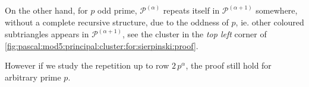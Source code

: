 
On the other hand, for $p$ odd prime, $\mathcal{P}^{(\alpha)}$ repeats itself
in $\mathcal{P}^{(\alpha+1)}$ somewhere, without a complete recursive
structure, due to the oddness of $p$, ie. other coloured subtriangles appears
in $\mathcal{P}^{(\alpha+1)}$, see the cluster in the \emph{top left} corner of
\autoref{fig:pascal:mod5:principal:cluster:for:sierpinski:proof}.

However if we study the repetition up to row
$2\,p^{\alpha}$, the proof still hold for arbitrary prime $p$.

\iffalse
, while in general we can say that maximal
triangles of coefficients multiples of $p$, appear with regularity in
$\mathcal{P}_{n+1}$ a number of times equals to:
\begin{displaymath}
    \frac{(p-1)p}{2}
\end{displaymath}
in other words, considering triangles $\mathcal{P}_{n}$ and
$\mathcal{P}_{n+1}$, there are $\frac{(p-1)p}{2}$ upside-down
maximal triangles, with all coefficients multiple of $p$, from row $p^n$
to row $p^{n+1}-1$; this result will be prove at the end of this 
section.
\fi

